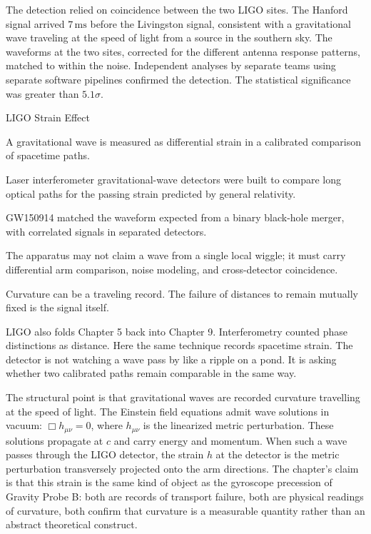 The detection relied on coincidence between the two LIGO sites. The
Hanford signal arrived $7\,\mathrm{ms}$ before the Livingston signal,
consistent with a gravitational wave traveling at the speed of light
from a source in the southern sky. The waveforms at the two sites,
corrected for the different antenna response patterns, matched to within
the noise. Independent analyses by separate teams using separate
software pipelines confirmed the detection. The statistical significance
was greater than $5{.}1\sigma$.

\begin{phenom}{LIGO Strain Effect}
\label{ph:ligo-strain-effect}

\PhStatement A gravitational wave is measured as differential strain in a
calibrated comparison of spacetime paths.

\PhOrigin Laser interferometer gravitational-wave detectors were built to
compare long optical paths for the passing strain predicted by general
relativity.

\PhObservation GW150914 matched the waveform expected from a binary black-hole
merger, with correlated signals in separated detectors.

\PhConstraint The apparatus may not claim a wave from a single local wiggle; it
must carry differential arm comparison, noise modeling, and cross-detector
coincidence.

\PhConsequence Curvature can be a traveling record. The failure of distances to
remain mutually fixed is the signal itself.

\end{phenom}

LIGO also folds Chapter 5 back into Chapter 9. Interferometry counted phase
distinctions as distance. Here the same technique records spacetime strain.
The detector is not watching a wave pass by like a ripple on a pond. It is
asking whether two calibrated paths remain comparable in the same way.

The structural point is that gravitational waves are recorded curvature
travelling at the speed of light. The Einstein field equations admit wave
solutions in vacuum: $\Box h_{\mu\nu} = 0$, where $h_{\mu\nu}$ is the
linearized metric perturbation. These solutions propagate at $c$ and carry
energy and momentum. When such a wave passes through the LIGO detector,
the strain $h$ at the detector is the metric perturbation transversely
projected onto the arm directions. The chapter's claim is that this strain
is the same kind of object as the gyroscope precession of Gravity Probe B:
both are records of transport failure, both are physical readings of
curvature, both confirm that curvature is a measurable quantity rather
than an abstract theoretical construct.

